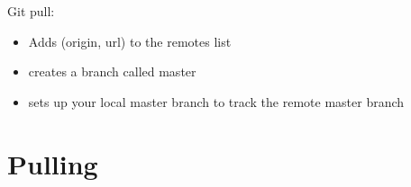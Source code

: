 Git pull:
\begin{itemize}
  \item Adds (origin, url) to the remotes list
  \item creates a branch called master
  \item sets up your local master branch to track the remote master branch
\end{itemize}

\section{Pulling}




















